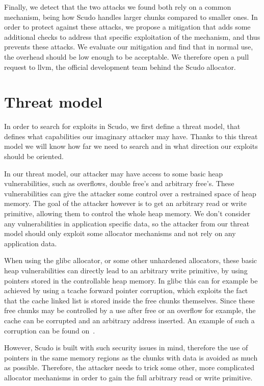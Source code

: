 \documentclass[a4paper,11pt,oneside]{report}
\begin{document}
Finally, we detect that the two attacks we found both rely on a common mechanism, being how
Scudo handles larger chunks compared to smaller ones. In order to protect against these
attacks, we propose a mitigation that adds some additional checks to address that specific
exploitation of the mechanism, and thus prevents these attacks. We evaluate our mitigation
and find that in normal use, the overhead should be low enough to be acceptable. We
therefore open a pull request to llvm, the official development team behind the Scudo
allocator.

\chapter{Threat model}

In order to search for exploits in Scudo, we first define a threat model, that defines
what capabilities our imaginary attacker may have. Thanks to this threat model we will
know how far we need to search and in what direction our exploits should be oriented.

In our threat model, our attacker may have access to some basic heap vulnerabilities, such
as overflows, double free's and arbitrary free's. These vulnerabilities can give the
attacker some control over a restrained space of heap memory. The goal of the attacker
however is to get an arbitrary read or write primitive, allowing them to control the whole
heap memory. We don't consider any vulnerabilities in application specific data, so the
attacker from our threat model should only exploit some allocator mechanisms and not rely
on any application data.

When using the glibc allocator, or some other unhardened allocators, these basic heap
vulnerabilities can directly lead to an arbitrary write primitive, by using pointers
stored in the controllable heap memory. In glibc this can for example be achieved by using
a tcache forward pointer corruption, which exploits the fact that the cache linked list is
stored inside the free chunks themselves. Since these free chunks may be controlled by a
use after free or an overflow for example, the cache can be corrupted and an arbitrary
address inserted. An example of such a corruption can be found on~\cite{tcachePoisoning}.

However, Scudo is built with such security issues in mind, therefore the use of pointers in
the same memory regions as the chunks with data is avoided as much as possible. Therefore,
the attacker needs to trick some other, more complicated allocator mechanisms in order to
gain the full arbitrary read or write primitive.
\end{document}
